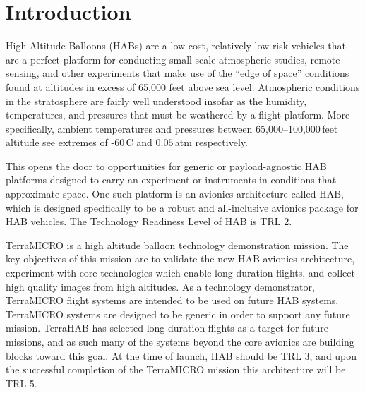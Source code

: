 
\section{Introduction}

High Altitude Balloons (HABs) are a low-cost, relatively low-risk vehicles that
are a perfect platform for conducting small scale atmospheric studies, remote
sensing, and other experiments that make use of the ``edge of space'' conditions
found at altitudes in excess of 65,000 feet above sea level. Atmospheric
conditions in the stratosphere are fairly well understood insofar as the
humidity, temperatures, and pressures that must be weathered by a flight
platform. More specifically, ambient temperatures and pressures between
65,000--100,000\,feet altitude see extremes of -60\textdegree\,C and $0.05$\,atm
respectively.

This opens the door to opportunities for generic or payload-agnostic HAB
platforms designed to carry an experiment or instruments in conditions that
approximate space. One such platform is an avionics architecture called \textmu
HAB, which is designed specifically to be a robust and all-inclusive avionics
package for HAB vehicles. The
\href{https://esto.nasa.gov/technologists_trl.html}{Technology Readiness Level}
of \textmu HAB is TRL 2. 

TerraMICRO is a high altitude balloon technology demonstration mission. The key
objectives of this mission are to validate the new \textmu HAB avionics
architecture, experiment with core technologies which enable long duration
flights, and collect high quality images from high altitudes. As a technology
demonstrator, TerraMICRO flight systems are intended to be used on future HAB
systems. TerraMICRO systems are designed to be generic in order to support any
future mission. TerraHAB has selected long duration flights as a target for
future missions, and as such many of the systems beyond the core avionics are
building blocks toward this goal. At the time of launch, \textmu HAB should be
TRL 3, and upon the successful completion of the TerraMICRO mission this
architecture will be TRL 5.

